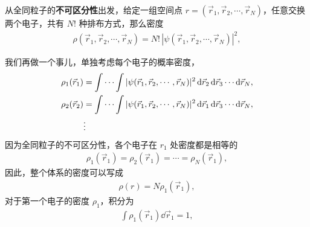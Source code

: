 从全同粒子的\textbf{不可区分性}出发，给定一组空间点 $r = (\vec r_1, \vec r_2, \cdots, \vec r_N)$，任意交换两个电子，共有 $N!$ 种排布方式，那么密度
\begin{align}
    \rho(\vec r_1, \vec r_2, \cdots, \vec r_N) = N! \,|\psi(\vec r_1, \vec r_2, \cdots, \vec r_N)|^2,
\end{align}

我们再做一个事儿，单独考虑每个电子的概率密度，
\begin{align}
    \rho_1 (\vec r_1) &= \int \cdots \int |\psi(\vec r_1, \vec r_2, \cdots, \vec r_N)|^2 \, \mathrm{d}\vec r_2\, \mathrm{d}\vec r_3 \cdots \mathrm{d}\vec r_N, \\
    \rho_2 (\vec r_2) &= \int \cdots \int |\psi(\vec r_1, \vec r_2, \cdots, \vec r_N)|^2 \, \mathrm{d}\vec r_1\, \mathrm{d}\vec r_3 \cdots \mathrm{d}\vec r_N, \\
    &\vdots \notag
\end{align}
因为全同粒子的不可区分性，各个电子在 $r_1$ 处密度都是相等的
\begin{align}
\rho_1(\vec r_1) = \rho_2(\vec r_1) = \cdots = \rho_N(\vec r_1),
\end{align}
因此，整个体系的密度可以写成
\begin{align}
    \rho(r) = N \rho_1(\vec r_1),
\end{align}
对于第一个电子的密度 $\rho_1$，积分为
\begin{align}
    \int \rho_1 (\vec r_1) \dd\vec r_1 = 1,
\end{align}

